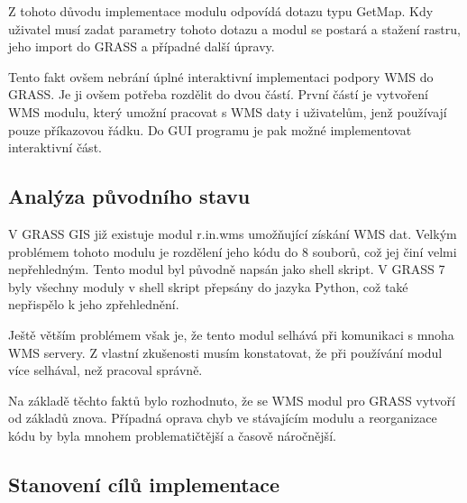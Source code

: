 \documentclass[a4paper,12pt]{article}
\begin{document}
Z tohoto důvodu implementace modulu odpovídá dotazu typu GetMap. Kdy uživatel musí zadat parametry tohoto dotazu a modul se postará a stažení rastru, jeho import do GRASS a případné další úpravy. 


Tento fakt ovšem nebrání úplné interaktivní implementaci podpory WMS do GRASS. Je ji ovšem potřeba rozdělit do dvou částí. První částí je vytvoření WMS modulu, který umožní pracovat s WMS daty i uživatelům, jenž používají
pouze příkazovou řádku.  Do GUI programu je pak možné implementovat interaktivní část.


\subsection{Analýza původního stavu}

 V GRASS GIS již existuje modul r.in.wms umožňující získání WMS dat.
Velkým problémem tohoto modulu je rozdělení jeho kódu do 8 souborů, což jej činí velmi nepřehledným. 
Tento modul byl původně napsán jako shell skript. V GRASS 7 byly všechny moduly v shell skript  přepsány do jazyka Python, což také nepřispělo k jeho zpřehlednění. 

Ještě větším problémem však je, že tento modul selhává při komunikaci s mnoha WMS servery. Z vlastní zkušenosti musím konstatovat, že při používání modul více selhával, než pracoval správně.

Na základě těchto faktů bylo rozhodnuto, že se WMS modul pro GRASS vytvoří od základů znova. Případná oprava chyb ve stávajícím modulu a reorganizace kódu by byla mnohem problematičtější a časově náročnější.

\newpage

\subsection{Stanovení cílů implementace}
\end{document}
